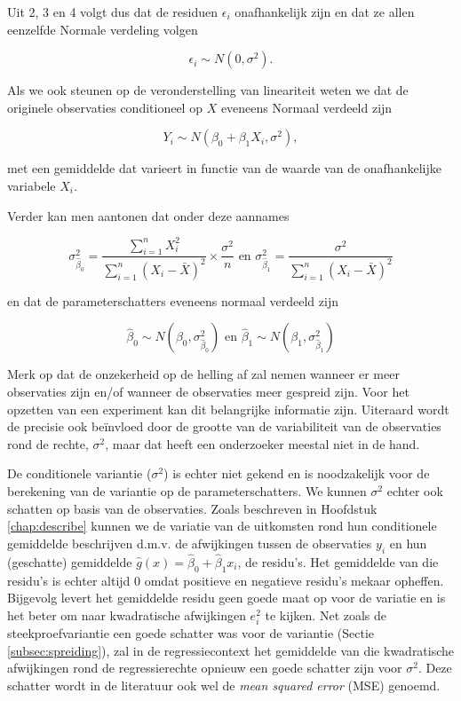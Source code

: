\documentclass[
  12pt,dutch,coursenotes]{book}
\theoremstyle{definition}
\theoremstyle{definition}
\theoremstyle{definition}
\theoremstyle{remark}
\begin{document}
Uit 2, 3 en 4 volgt dus dat de residuen \(\epsilon_i\) onafhankelijk zijn en dat ze allen eenzelfde Normale verdeling volgen

\[\epsilon_i \sim N(0,\sigma^2).\]

Als we ook steunen op de veronderstelling van lineariteit weten we dat de originele observaties conditioneel op \(X\) eveneens Normaal verdeeld zijn

\[Y_i\sim N(\beta_0+\beta_1 X_i,\sigma^2),\]

met een gemiddelde dat varieert in functie van de waarde van de onafhankelijke variabele \(X_i\).

Verder kan men aantonen dat onder deze aannames

\[\sigma^2_{\hat{\beta}_0}=\frac{\sum\limits_{i=1}^n X^2_i}{\sum\limits_{i=1}^n (X_i-\bar X)^2} \times\frac{\sigma^2}{n} \text{ en } \sigma^2_{\hat{\beta}_1}=\frac{\sigma^2}{\sum\limits_{i=1}^n (X_i-\bar X)^2}\]

en dat de parameterschatters eveneens normaal verdeeld zijn

\[\hat\beta_0 \sim N\left(\beta_0,\sigma^2_{\hat \beta_0}\right) \text{ en } \hat\beta_1 \sim N\left(\beta_1,\sigma^2_{\hat \beta_1}\right)\]

Merk op dat de onzekerheid op de helling af zal nemen wanneer er meer observaties zijn en/of wanneer de observaties meer gespreid zijn. Voor het opzetten van een experiment kan dit belangrijke informatie zijn. Uiteraard wordt de precisie ook beïnvloed door de grootte van de variabiliteit van de observaties rond de rechte, \(\sigma^2\), maar dat heeft een onderzoeker meestal niet in de hand.

De conditionele variantie (\(\sigma^2\)) is echter niet gekend en is noodzakelijk voor de berekening van de variantie op de parameterschatters. We kunnen \(\sigma^2\) echter ook schatten op basis van de observaties.
Zoals beschreven in Hoofdstuk \ref{chap:describe} kunnen we de variatie van de uitkomsten rond hun conditionele gemiddelde beschrijven d.m.v. de afwijkingen tussen de observaties \(y_i\) en hun (geschatte) gemiddelde \(\hat{g}(x)=\hat{\beta}_0+\hat{\beta}_1x_i\), de residu's.
Het gemiddelde van die residu's is echter altijd 0 omdat positieve en negatieve residu's mekaar
opheffen. Bijgevolg levert het gemiddelde residu geen goede maat op voor de variatie en is het beter om naar kwadratische afwijkingen \(e_i^2\) te kijken.
Net zoals de steekproefvariantie een goede schatter was voor de variantie (Sectie \ref{subsec:spreiding}), zal in de regressiecontext het gemiddelde van die kwadratische afwijkingen rond de regressierechte opnieuw een goede schatter zijn voor \(\sigma^2\). Deze schatter wordt in de literatuur ook wel de \emph{mean squared error} (MSE) genoemd.
\end{document}
